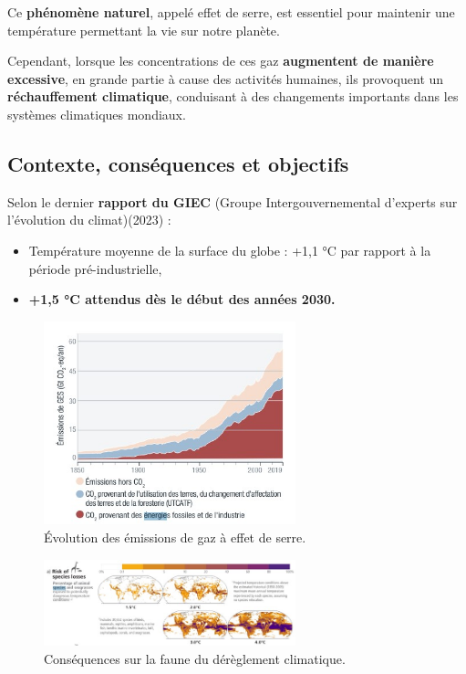 \documentclass[11pt, a4paper]{book}
\begin{document}
Ce \textbf{phénomène naturel}, appelé effet de serre, est essentiel pour maintenir une température permettant la vie sur notre planète.


Cependant, lorsque les concentrations de ces gaz \textbf{augmentent de manière excessive}, en grande partie à cause des activités humaines, ils provoquent un \textbf{réchauffement climatique}, conduisant à des changements importants dans les systèmes climatiques mondiaux.




\subsection{Contexte, conséquences et objectifs}
Selon le dernier \textbf{rapport du GIEC }(Groupe Intergouvernemental d’experts sur l’évolution du climat)(2023) :
\begin{itemize}
  \item Température moyenne de la surface du globe : +1,1 °C par rapport à la période pré-industrielle,
  \item \textbf{+1,5 °C attendus dès le début des années 2030.}
\end{itemize}



\begin{figure}[h!]
  \centering
  \includegraphics[width=0.65\textwidth]{images/impact-eco/image10.png}
  \caption{Évolution des émissions de gaz à effet de serre.}
  \label{fig:ges-schema}
\end{figure}
\begin{figure}[h!]
  \centering
  \includegraphics[width=0.65\textwidth]{images/impact-eco/image3.png}
  \caption{Conséquences sur la faune du dérèglement climatique.}
  \label{fig:ges-faune}
\end{figure}
\end{document}
